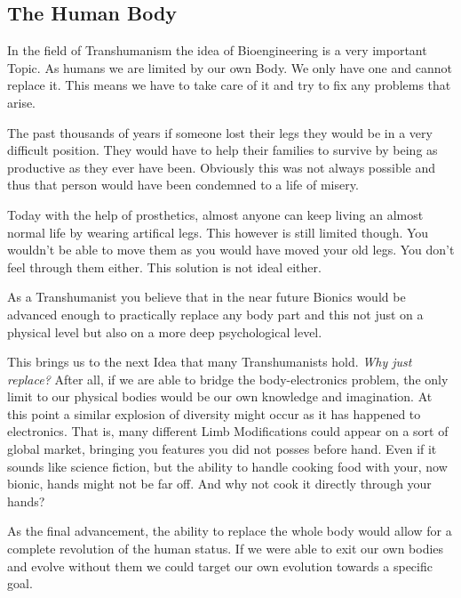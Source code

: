 \documentclass[
			12pt,
			a4paper,
			cleardoublepage=empty,
			final,
			twoside
				]{scrbook}
\begin{document}
    \subsection{The Human Body}
      \begin{par}
	      In the field of Transhumanism the idea of Bioengineering is a very important Topic. As humans we are limited by our own Body. We only have one and cannot replace it. This means we have to take care of it and try to fix any problems that arise. 
      \end{par}
      \begin{par}
        The past thousands of years if someone lost their legs they would be in a very difficult position. They would have to help their families to survive by being as productive as they ever have been. Obviously this was not always possible and thus that person would have been condemned to a life of misery.
      \end{par}
      \begin{par}
        Today with the help of prosthetics, almost anyone can keep living an almost normal life by wearing artifical legs. This however is still limited though. You wouldn't be able to move them as you would have moved your old legs. You don't feel through them either. This solution is not ideal either.
      \end{par}
      \begin{par}
        As a Transhumanist you believe that in the near future Bionics would be advanced enough to practically replace any body part and this not just on a physical level but also on a more deep psychological level.
      \end{par}
      \begin{par}
        This brings us to the next Idea that many Transhumanists hold. \emph{Why just replace?} After all, if we are able to bridge the body-electronics problem, the only limit to our physical bodies would be our own knowledge and imagination. At this point a similar explosion of diversity might occur as it has happened to electronics. That is, many different Limb Modifications could appear on a sort of global market, bringing you features you did not posses before hand. Even if it sounds like science fiction, but the ability to handle cooking food with your, now bionic, hands might not be far off. And why not cook it directly through your hands? 
      \end{par}
      \begin{par}
        As the final advancement, the ability to replace the whole body would allow for a complete revolution of the human status. If we were able to exit our own bodies and evolve without them we could target our own evolution towards a specific goal.\cite{NBICReport} 
      \end{par}
\end{document}
